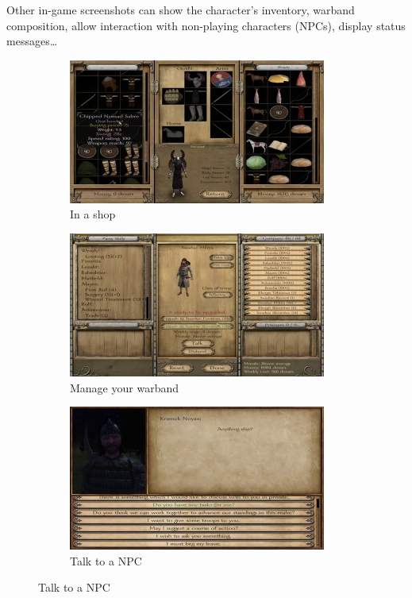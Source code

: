 \documentclass[
]{article}
\begin{document}
Other in-game screenshots can show the character's inventory, warband
composition, allow interaction with non-playing characters (NPCs), display status
messages\ldots{}


\begin{figure}[H]
	\centering
	\begin{subfigure}[b]{0.3\textwidth}
		\includegraphics[width=\linewidth]{docimages/E_0056_00_31_30.jpg}
		\caption{In a shop}
	\end{subfigure}
	\begin{subfigure}[b]{0.3\textwidth}
		\includegraphics[width=\linewidth]{docimages/E_0056_00_58_08.jpg}
		\caption{Manage your warband}
	\end{subfigure}
	\begin{subfigure}[b]{0.3\textwidth}
		\includegraphics[width=\linewidth]{docimages/E_0059_00_26_26.jpg}
		\caption{Talk to a NPC}
	\end{subfigure}
\end{figure}
\end{document}
